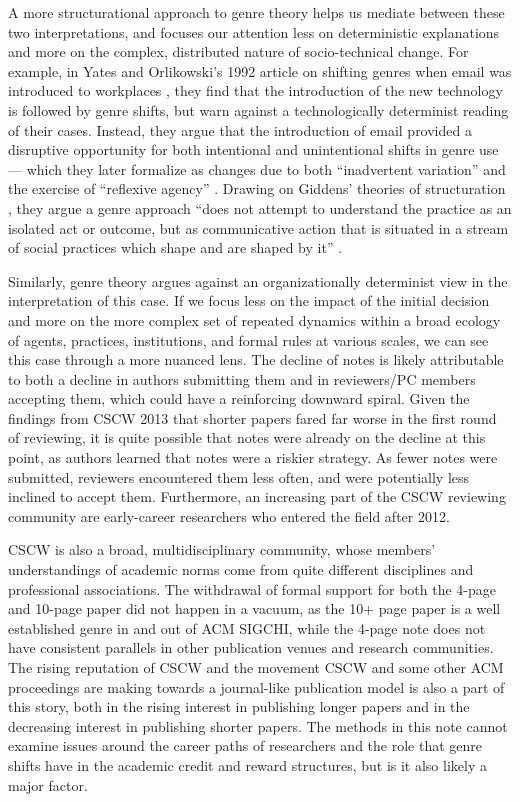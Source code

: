 \documentclass[format=acmsmall, screen=true]{acmart}
\begin{document}
A more structurational approach to genre theory helps us mediate between these two interpretations, and focuses our attention less on deterministic explanations and more on the complex, distributed nature of socio-technical change. For example, in Yates and Orlikowski's 1992 article on shifting genres when email was introduced to workplaces \cite{yates1992}, they find that the introduction of the new technology is followed by genre shifts, but warn against a technologically determinist reading of their cases. Instead, they argue that the introduction of email provided a disruptive opportunity for both intentional and unintentional shifts in genre use --- which they later formalize as changes due to both ``inadvertent variation'' and the exercise of ``reflexive agency'' \cite{orlikowski_genre_1994}. Drawing on Giddens' theories of structuration \cite{anthony1984constitution}, they argue a genre approach ``does not attempt to understand the practice as an isolated act or outcome, but as communicative action that is situated in a stream of social practices which shape and are shaped by it'' \cite[p. 318]{yates1992}.

Similarly, genre theory argues against an organizationally determinist view in the interpretation of this case. If we focus less on the impact of the initial decision and more on the more complex set of repeated dynamics within a broad ecology of agents, practices, institutions, and formal rules at various scales, we can see this case through a more nuanced lens. The decline of notes is likely attributable to both a decline in authors submitting them and in reviewers/PC members accepting them, which could have a reinforcing downward spiral. Given the findings from CSCW 2013 \cite{terveen_process_2013} that shorter papers fared far worse in the first round of reviewing, it is quite possible that notes were already on the decline at this point, as authors learned that notes were a riskier strategy. As fewer notes were submitted, reviewers encountered them less often, and were potentially less inclined to accept them. Furthermore, an increasing part of the CSCW reviewing community are early-career researchers who entered the field after 2012.

CSCW is also a broad, multidisciplinary community, whose members' understandings of academic norms come from quite different disciplines and professional associations. The withdrawal of formal support for both the 4-page and 10-page paper did not happen in a vacuum, as the 10+ page paper is a well established genre in and out of ACM SIGCHI, while the 4-page note does not have consistent parallels in other publication venues and research communities. The rising reputation of CSCW and the movement CSCW and some other ACM proceedings are making towards a journal-like publication model is also a part of this story, both in the rising interest in publishing longer papers and in the decreasing interest in publishing shorter papers. The methods in this note cannot examine issues around the career paths of researchers and the role that genre shifts have in the academic credit and reward structures, but is it also likely a major factor.
\end{document}
